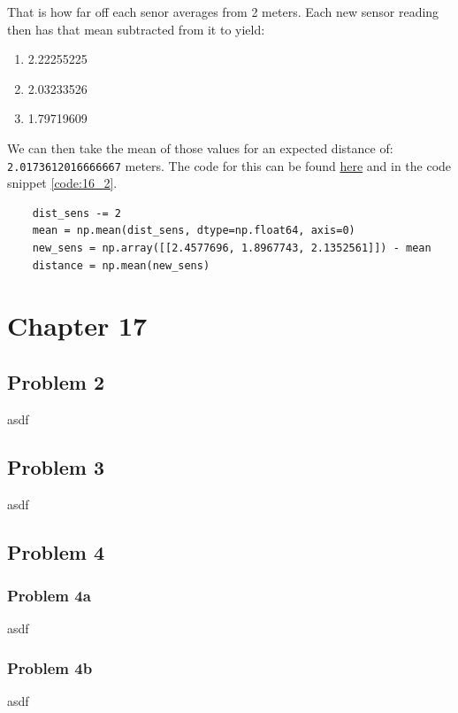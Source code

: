 \documentclass{article}
\begin{document}
That is how far off each senor averages from 2 meters. Each new sensor reading 
then has that mean subtracted from it to yield:

\begin{enumerate}[label=\Alph*]
    \item 2.22255225
    \item 2.03233526
    \item 1.79719609
\end{enumerate}

We can then take the mean of those values for an expected distance of: 
\texttt{2.0173612016666667} meters. The code for this can be found 
\href{https://github.com/macattackftw/RoboticsHW/blob/master/HW5/problem16_2_data.py}{here} 
and in the code snippet \ref{code:16_2}.

\begin{code}
\label{code:16_2}
\begin{verbatim}
    dist_sens -= 2
    mean = np.mean(dist_sens, dtype=np.float64, axis=0)
    new_sens = np.array([[2.4577696, 1.8967743, 2.1352561]]) - mean
    distance = np.mean(new_sens)
\end{verbatim}
\end{code}


\newpage
\section{\textbf{Chapter 17}}
\subsection{Problem 2}
asdf


\subsection{Problem 3}
asdf


\subsection{Problem 4}
\subsubsection{Problem 4a}
asdf

\subsubsection{Problem 4b}
asdf
\end{document}
